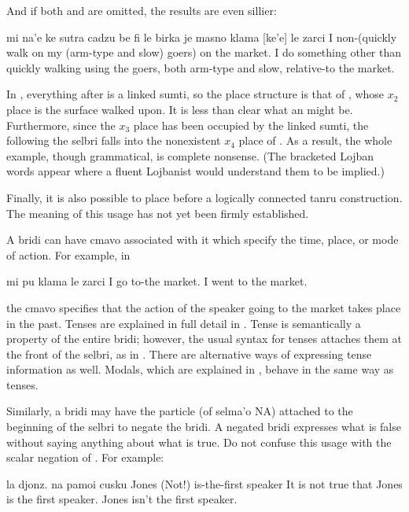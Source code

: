 And if both  and  are omitted, the results
    are even sillier:
\begin{example}
mi na'e ke sutra cadzu be fi le birka\n
\T	je masno klama  [ke'e] le zarci\n
I non-(quickly walk on my (arm-type\n
\T	and slow) goers) on the market.\n
I do something other than quickly walking using the\n
\T	goers, both arm-type and slow, relative-to the market.
\end{example}

In , everything after
     is a linked sumti, so the place structure is that of
    , whose $x_2$ place is the surface walked upon. It is
    less than clear what an  might be.
    Furthermore, since the $x_3$ place has been occupied by the linked
    sumti, the  following the selbri falls into the
    nonexistent $x_4$ place of . As a result, the whole
    example, though grammatical, is complete nonsense. (The
    bracketed Lojban words appear where a fluent Lojbanist would
    understand them to be implied.)

Finally, it is also possible to place  before a
     logically connected tanru construction. The
    meaning of this usage has not yet been firmly established.



A bridi can have cmavo associated with it which specify the
    time, place, or mode of action. For example, in
\begin{example}
mi pu klama le zarci\n
I  go to-the market.\n
I went to the market.
\end{example}

{\noindent}the cmavo  specifies that the action of the speaker going
    to the market takes place in the past. Tenses are explained in
    full detail in . Tense is
    semantically a property of the entire bridi; however, the usual
    syntax for tenses attaches them at the front of the selbri, as
    in . There are alternative
    ways of expressing tense information as well. Modals, which are
    explained in , behave in the
    same way as tenses. 

Similarly, a bridi may have the particle  (of selma'o
    NA) attached to the beginning of the selbri to negate the
    bridi. A negated bridi expresses what is false without saying
    anything about what is true. Do not confuse this usage with the
    scalar negation of . For
    example:
\begin{example}
la djonz. na pamoi cusku\n
Jones (Not!) is-the-first speaker\n
It is not true that Jones is the first speaker.\n
Jones isn't the first speaker.
\end{example}

